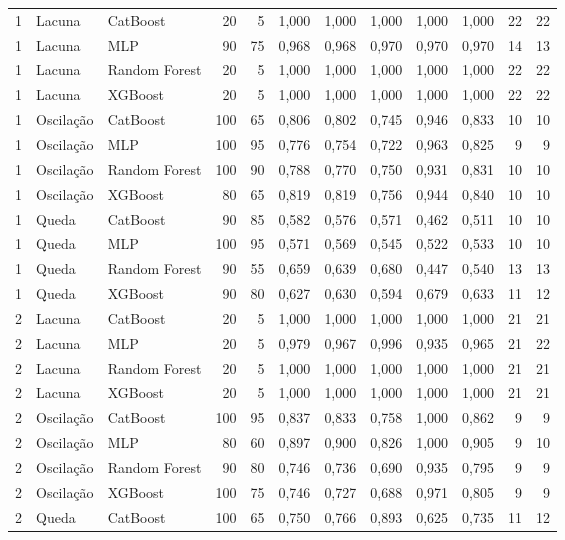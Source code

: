 \begin{longtable}{@{}rllrrrrrrrrr@{}}
1 & Lacuna & CatBoost & 20 & 5 & 1,000 & 1,000 & 1,000 & 1,000 & 1,000 & 22 & 22 \\
1 & Lacuna & MLP & 90 & 75 & 0,968 & 0,968 & 0,970 & 0,970 & 0,970 & 14 & 13 \\
1 & Lacuna & Random Forest & 20 & 5 & 1,000 & 1,000 & 1,000 & 1,000 & 1,000 & 22 & 22 \\
1 & Lacuna & XGBoost & 20 & 5 & 1,000 & 1,000 & 1,000 & 1,000 & 1,000 & 22 & 22 \\
1 & Oscilação & CatBoost & 100 & 65 & 0,806 & 0,802 & 0,745 & 0,946 & 0,833 & 10 & 10 \\
1 & Oscilação & MLP & 100 & 95 & 0,776 & 0,754 & 0,722 & 0,963 & 0,825 & 9 & 9 \\
1 & Oscilação & Random Forest & 100 & 90 & 0,788 & 0,770 & 0,750 & 0,931 & 0,831 & 10 & 10 \\
1 & Oscilação & XGBoost & 80 & 65 & 0,819 & 0,819 & 0,756 & 0,944 & 0,840 & 10 & 10 \\
1 & Queda & CatBoost & 90 & 85 & 0,582 & 0,576 & 0,571 & 0,462 & 0,511 & 10 & 10 \\
1 & Queda & MLP & 100 & 95 & 0,571 & 0,569 & 0,545 & 0,522 & 0,533 & 10 & 10 \\
1 & Queda & Random Forest & 90 & 55 & 0,659 & 0,639 & 0,680 & 0,447 & 0,540 & 13 & 13 \\
1 & Queda & XGBoost & 90 & 80 & 0,627 & 0,630 & 0,594 & 0,679 & 0,633 & 11 & 12 \\
2 & Lacuna & CatBoost & 20 & 5 & 1,000 & 1,000 & 1,000 & 1,000 & 1,000 & 21 & 21 \\
2 & Lacuna & MLP & 20 & 5 & 0,979 & 0,967 & 0,996 & 0,935 & 0,965 & 21 & 22 \\
2 & Lacuna & Random Forest & 20 & 5 & 1,000 & 1,000 & 1,000 & 1,000 & 1,000 & 21 & 21 \\
2 & Lacuna & XGBoost & 20 & 5 & 1,000 & 1,000 & 1,000 & 1,000 & 1,000 & 21 & 21 \\
2 & Oscilação & CatBoost & 100 & 95 & 0,837 & 0,833 & 0,758 & 1,000 & 0,862 & 9 & 9 \\
2 & Oscilação & MLP & 80 & 60 & 0,897 & 0,900 & 0,826 & 1,000 & 0,905 & 9 & 10 \\
2 & Oscilação & Random Forest & 90 & 80 & 0,746 & 0,736 & 0,690 & 0,935 & 0,795 & 9 & 9 \\
2 & Oscilação & XGBoost & 100 & 75 & 0,746 & 0,727 & 0,688 & 0,971 & 0,805 & 9 & 9 \\
2 & Queda & CatBoost & 100 & 65 & 0,750 & 0,766 & 0,893 & 0,625 & 0,735 & 11 & 12 \\

\end{longtable}
